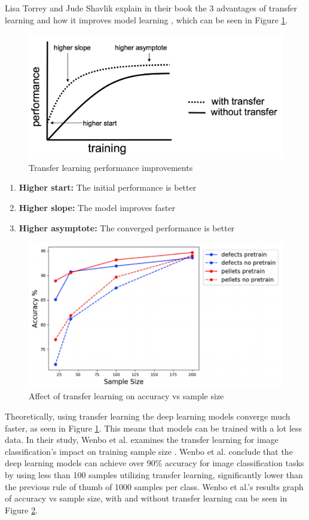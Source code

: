 Lisa Torrey and Jude Shavlik explain in their book the 3 advantages of transfer learning and how it improves model learning \cite{10.5555/1803899}, which can be seen in Figure \ref{fig:TL}.

\begin{figure}[h]
\centering
\includegraphics[width = 0.7\hsize]{figures/transfer-learning.png}
\caption{Transfer learning performance improvements \cite{10.5555/1803899}}
\label{fig:TL}
\end{figure}

\begin{enumerate}
  \item \textbf{Higher start:} The initial performance is better 
  \item \textbf{Higher slope:} The model improves faster 
  \item \textbf{Higher asymptote:} The converged performance is better 
\end{enumerate}

\begin{figure}[h]
\centering
\includegraphics[width = 0.7\hsize]{figures/transfer learning results.png}
\caption{Affect of transfer learning on accuracy vs sample size \cite{ZHU2021104269}}
\label{fig:TL-results}
\end{figure}

Theoretically, using transfer learning the deep learning models converge much faster, as seen in Figure \ref{fig:TL}. This means that models can be trained with a lot less data. In their study, Wenbo et al. examines the transfer learning for image classification's impact on training sample size \cite{ZHU2021104269}. Wenbo et al. conclude that the deep learning models can achieve over 90\% accuracy for image classification tasks by using less than 100 samples utilizing transfer learning, significantly lower than the previous rule of thumb of 1000 samples per class. Wenbo et al.'s results graph of accuracy vs sample size, with and without transfer learning can be seen in Figure \ref{fig:TL-results}.

